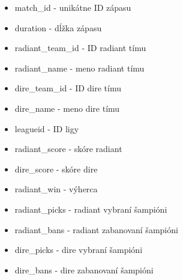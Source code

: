  \begin{itemize}
\item match\_id - unikátne ID zápasu 
\item duration - dĺžka zápasu 
\item radiant\_team\_id - ID radiant tímu 
\item radiant\_name - meno radiant tímu 
\item dire\_team\_id - ID dire tímu 
\item dire\_name - meno dire tímu 
\item leagueid - ID ligy
\item radiant\_score - skóre radiant
\item dire\_score - skóre dire
\item radiant\_win - výherca
\item radiant\_picks - radiant vybraní šampióni
\item radiant\_bans - radiant zabanovaní šampióni
\item dire\_picks - dire vybraní šampióni
\item dire\_bans - dire zabanovaní šampióni
\end{itemize}

